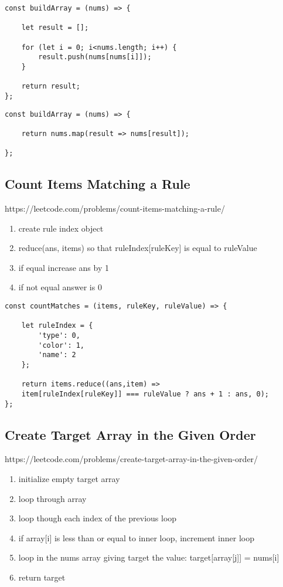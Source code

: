 \documentclass[10pt]{article}
\begin{document}
\begin{lstlisting}[title=Solution with for loop, captionpos=t]
const buildArray = (nums) => {

    let result = [];

    for (let i = 0; i<nums.length; i++) { 
        result.push(nums[nums[i]]);
    }

    return result; 
};
\end{lstlisting}
	
\begin{lstlisting}[title=Solution with map(), captionpos=t]
const buildArray = (nums) => {

    return nums.map(result => nums[result]);
    
};
\end{lstlisting}
\medskip %

\pagebreak
\medskip %
\subsection{Count Items Matching a Rule}
https://leetcode.com/problems/count-items-matching-a-rule/

\begin{enumerate}
	\item create rule index object
	\item reduce(ans, items) so that ruleIndex[ruleKey] is equal to ruleValue
	\item if equal increase ans by 1
	\item if not equal answer is 0 
\end{enumerate}

\begin{lstlisting}[title=Solution countMatches, captionpos=t]
const countMatches = (items, ruleKey, ruleValue) => {
    
    let ruleIndex = {
        'type': 0,
        'color': 1,
        'name': 2
    };
    
    return items.reduce((ans,item) => 
    item[ruleIndex[ruleKey]] === ruleValue ? ans + 1 : ans, 0);
};
\end{lstlisting}
\medskip %

\pagebreak
\medskip %
\subsection{Create Target Array in the Given Order}
https://leetcode.com/problems/create-target-array-in-the-given-order/

\begin{enumerate}
	\item initialize empty target array
	\item loop through array 
	\item loop though each index of the previous loop
	\item if array[i] is less than or equal to inner loop, increment inner loop
	\item loop in the nums array giving target the value: target[array[j]] = nums[i]
	\item return target 
\end{enumerate}
\end{document}
